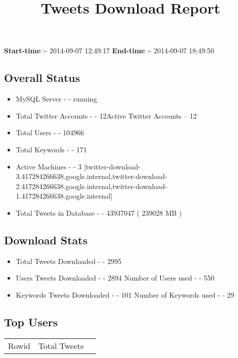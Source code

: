 \documentclass{article}\usepackage[T1]{fontenc}
\begin{document}
\title{\textbf{Tweets Download Report}}
               \date{}
                \maketitle
               \centerline{\textbf{Start-time} :- 2014-09-07 12:49:17 \hspace{40pt} \textbf{End-time} :- 2014-09-07 18:49:50}               \subsection*{Overall Status}                \begin{itemize}                \item MySQL Server - - running               \item Total Twitter Accounts - - 12\newline Active Twitter Accounts -- 12               \item Total Users - - 104966               \item Total Keywords - - 171               \item Active Machines - - 3 [twitter-download-3.417284266638.google.internal,twitter-download-2.417284266638.google.internal,twitter-download-1.417284266638.google.internal]               \item Total Tweets in Database - - 43937047 ( 239028 MB )               \end{itemize}               \subsection*{Download Stats}                \begin{itemize}                \item Total Tweets Downloaded - - 2995               \item Users Tweets Downloaded - - 2894 \newline Number of Users used - - 550               \item Keywords Tweets Downloaded - - 101 \newline Number of Keywords used - - 29              \end{itemize}              \subsection*{Top Users}\begin{tabular}{|c|c|c|}         \hline         Rowid & Total Tweets \\ 

\end{tabular}
\end{document}
